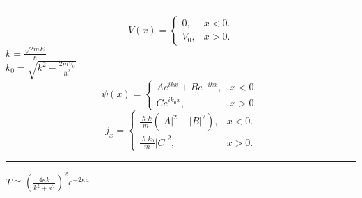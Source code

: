 \documentclass[0pt]{report}
\begin{document}
\begin{multicols}{3}
\begin{flushleft}
\noindent\rule[0.5ex]{\linewidth}{.25pt}
\begin{equation*}
  V(x)=\begin{cases}
    0, & \text{$x<0$}.\\
    V_0, & \text{$x>0$}.
  \end{cases}
\end{equation*}
$k=\frac{\sqrt{2mE}}{\hslash}$\\
$k_0=\sqrt{k^2-\frac{2mV_0}{\hslash^2}}$
\begin{equation*}
  \psi(x)=\begin{cases}
    Ae^{ikx}+Be^{-ikx}, & \text{$x<0$}.\\
    Ce^{ik_0x}, & \text{$x>0$}.
  \end{cases}
\end{equation*}
\begin{equation*}
  j_x=\begin{cases}
    \frac{\hslash k}{m}(|A|^2-|B|^2), & \text{$x<0$}.\\
    \frac{\hslash k_0}{m}|C|^2, & \text{$x>0$}.
  \end{cases}
\end{equation*}
\noindent\rule[0.5ex]{\linewidth}{.25pt}
$T\cong(\frac{4\kappa k}{k^2+\kappa^2})^2e^{-2\kappa a}$
\end{flushleft}
\end{multicols}
\end{document}
